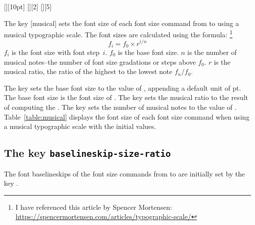 \documentclass{beery}
\begin{document}


\begin{mydisplaycode}
  [][10pt]%
  \nopagebreak\newline
  [][2]%
  \nopagebreak\newline
  [][5]
\end{mydisplaycode}

The key [musical] sets the font size of each font size command from  to  using a musical typographic scale.
The font sizes are calculated using the formula:%
\footnote
  {%
    I have referenced this article by Spencer Mortensen:
    \newline
    \url{https://spencermortensen.com/articles/typographic-scale/}%
  }
\begin{equation}\label{eq:musical}
  f_i = f_0 \times r ^ { i / n }
\end{equation}
$f_i$ is the font size with font step~$i$.
$f_0$ is the base font size.
$n$ is the number of musical notes\---the number of font size gradations or steps above $f_0$.
$r$ is the musical ratio, the ratio of the highest to the lowest note $ f_n / f_0 $.

The key  sets the base font size to the value of , appending a default unit of \unit{pt}.
The base font size is the font size of .
The key  sets the musical ratio to the result of computing the .
The key  sets the number of musical notes to the value of .
Table~\ref{table:musical} displays the font size of each font size command when using a musical typographic scale with the initial values.



\subsection
  {%
    The key
    \texorpdfstring
      {\texttt{baselineskip-size-ratio}}
      {baselineskip-size-ratio}%
  }
\label{subsec:baselineskipsizeratio}

The font baselineskips of the font size commands from  to  are initially set by the key .
\end{document}
